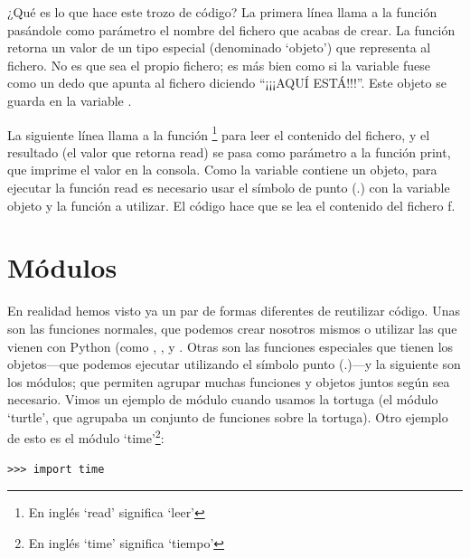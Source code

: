 ¿Qué es lo que hace este trozo de código?  La primera línea llama a la función  pasándole como parámetro el nombre del fichero que acabas de crear.  La función retorna un valor de un tipo especial (denominado `objeto') que representa al fichero.  No es que sea el propio fichero; es más bien como si la variable fuese como un dedo que apunta al fichero diciendo ``¡¡¡AQUÍ ESTÁ!!!''. Este objeto se guarda en la variable .
\par
La siguiente línea llama a la función \footnote{En inglés `read' significa `leer'} para leer el contenido del fichero, y el resultado (el valor que retorna read) se pasa como parámetro a la función print, que imprime el valor en la consola.  Como la variable  contiene un objeto, para ejecutar la función read es necesario usar el símbolo de punto (.) con la variable objeto y la función a utilizar. El código  hace que se lea el contenido del fichero f.


\section{Módulos}

En realidad hemos visto ya un par de formas diferentes de reutilizar código. Unas son las funciones normales, que podemos crear nosotros mismos o utilizar las que vienen con Python (como , ,  y . Otras son las funciones especiales que tienen los objetos---que podemos ejecutar utilizando el símbolo punto (.)---y la siguiente son los módulos; que permiten agrupar muchas funciones y objetos juntos según sea necesario. Vimos un ejemplo de módulo cuando usamos la tortuga (el módulo `turtle', que agrupaba un conjunto de funciones sobre la tortuga). Otro ejemplo de esto es el módulo `time'\footnote{En inglés `time' significa `tiempo'}:

\begin{listing}
\begin{verbatim}
>>> import time
\end{verbatim}
\end{listing}

